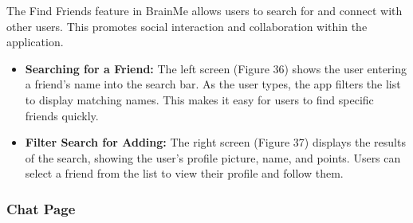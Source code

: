 The Find Friends feature in BrainMe allows users to search for and connect with other users. This promotes social interaction and collaboration within the application.

\begin{itemize}
\item \textbf{Searching for a Friend:} The left screen (Figure 36) shows the user entering a friend's name into the search bar. As the user types, the app filters the list to display matching names. This makes it easy for users to find specific friends quickly.
\item \textbf{Filter Search for Adding:} The right screen (Figure 37) displays the results of the search, showing the user’s profile picture, name, and points. Users can select a friend from the list to view their profile and follow them.
\end{itemize}

\subsubsection{Chat Page}


